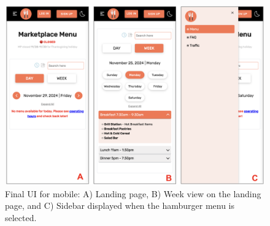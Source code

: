\documentclass[10pt,twocolumn]{article}
\begin{document}
\begin{figure}
    \centering
    \includegraphics[width=1.0\linewidth]{images/final-UI-mobile.png} %
    \caption{
       Final UI for mobile: A) Landing page, B) Week view on the landing page, and C) Sidebar displayed when the hamburger menu is selected.
    }\label{final-UI-mobile}
\end{figure}
\end{document}
